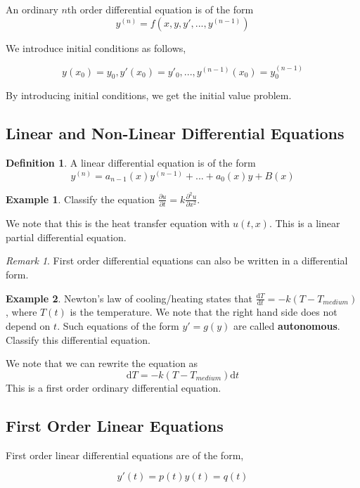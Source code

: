 \documentclass[11pt]{article}
\theoremstyle{plain} %
\theoremstyle{definition}
\newtheorem*{definition}{Definition} %
\theoremstyle{example}
\newtheorem*{example}{Example}
\theoremstyle{remark}
\newtheorem*{remark}{Remark}
\begin{document}
An ordinary $n$th order differential equation is of the form $$y^{(n)}= f\left (x, y, y',...,y^{(n-1)}\right)$$

We introduce initial conditions as follows,

$$y(x_0) = y_0, y'(x_0)=y'_0,...,y^{(n-1)}(x_0) = y_0^{(n-1)}$$

By introducing initial conditions, we get the initial value problem. 

\subsection{Linear and Non-Linear Differential Equations}


\begin{definition}
A linear differential equation is of the form $$y^{(n)} = a_{n-1}(x)y^{(n-1)} + ... + a_0(x)y + B(x)$$
\end{definition}

\begin{example}
Classify the equation $\frac{\partial u}{\partial t} = k\frac{\partial^2 u}{\partial x^2}$.
\end{example}

We note that this is the heat transfer equation with $u(t,x)$. This is a linear partial differential equation. 

\begin{remark}
First order differential equations can also be written in a differential form.
\end{remark}
\begin{example}
Newton's law of cooling/heating states that $\frac{\mathrm d T}{\mathrm d t} = -k(T-T_{medium})$, where $T(t)$ is the temperature. We note that the right hand side does not depend on $t$. Such equations of the form $y' = g(y)$ are called \textbf{autonomous}. Classify this differential equation.
\end{example}

We note that we can rewrite the equation as $$\mathrm d T = -k(T-T_{medium})\mathrm d t$$ This is a first order ordinary differential equation.

\subsection{First Order Linear Equations}

First order linear differential equations are of the form,

$$y'(t) = p(t)y(t)= q(t)$$
\end{document}
